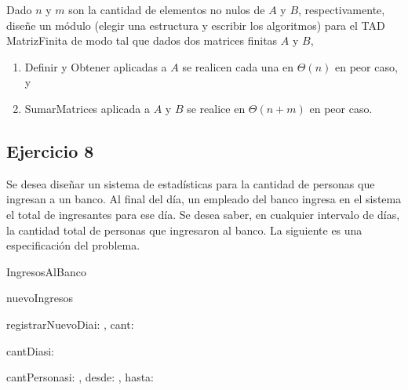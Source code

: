 Dado $n$ y $m$ son la cantidad de elementos no nulos de $A$ y $B$, respectivamente, diseñe un módulo (elegir una estructura y escribir los algoritmos) para el TAD MatrizFinita de modo tal que dados dos matrices finitas $A$ y $B$,
\begin{enumerate}[label=(\alph*)]
	\item Definir y Obtener aplicadas a $A$ se realicen cada una en $\Theta(n)$ en peor caso, y
	\item SumarMatrices aplicada a $A$ y $B$ se realice en $\Theta(n + m)$ en peor caso.
\end{enumerate}

\hacer

\subsection{Ejercicio 8}
Se desea diseñar un sistema de estadísticas para la cantidad de personas que ingresan a un banco. Al final del día, un empleado del banco ingresa en el sistema el total de ingresantes para ese día. Se desea saber, en cualquier intervalo de días, la cantidad total de personas que ingresaron al banco. La siguiente es una especificación del problema.

\begin{tad}{IngresosAlBanco}{}

	\begin{proc}{nuevoIngresos}{}{\tadtype}
	\end{proc}

	\begin{proc}{registrarNuevoDia}{\Inout i: \tadtype, \In cant: \ent}{}
	\end{proc}

	\begin{proc}{cantDias}{\In i: \tadtype}{\ent}
	\end{proc}

	\begin{proc}{cantPersonas}{\In i: \tadtype, \In desde: \ent, \In hasta: \ent}{\ent}
	\end{proc}
\end{tad}

